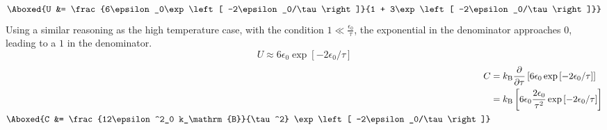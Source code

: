 \documentclass{article}
\begin{document}
\begin{enumerate}
\begin{equation}
\begin{split}
				\Aboxed{U &= \frac{6\epsilon_0\exp\left[ -2\epsilon_0/\tau \right]}{1 + 3\exp\left[ -2\epsilon_0/\tau \right]}}
			\end{split}
		\end{equation}
		Using a similar reasoning as the high temperature case, with the condition $1 \ll \frac{\epsilon_0}{\tau}$, the exponential in the denominator approaches $0$, leading to a $1$ in the denominator.
		\begin{equation}
			\boxed{U \approx 6\epsilon_0\exp\left[ -2\epsilon_0/\tau \right]}
		\end{equation}
		\begin{equation}
			\begin{split}
				C &= k_\mathrm{B} \frac{\partial}{\partial \tau} \left[ 6\epsilon_0\exp\left[ -2\epsilon_0/\tau \right] \right] \\
				  &= k_\mathrm{B} \left[ 6\epsilon_0 \frac{2\epsilon_0}{\tau^2} \exp\left[ -2\epsilon_0/\tau \right] \right] \\
				\Aboxed{C &= \frac{12\epsilon^2_0 k_\mathrm{B}}{\tau^2} \exp\left[ -2\epsilon_0/\tau \right]}
			\end{split}
		\end{equation}
		

\end{enumerate}
\end{document}

